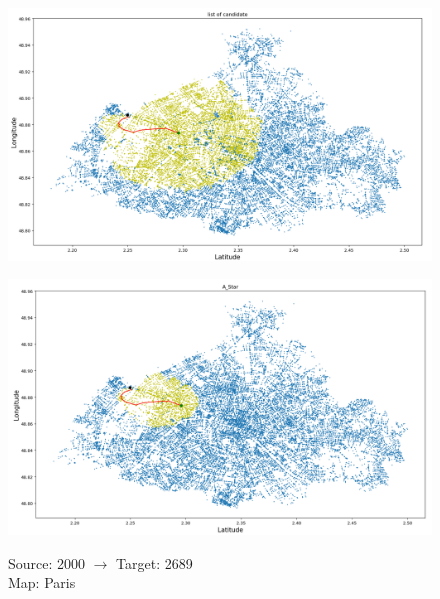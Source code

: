 \documentclass[a4paper,11pt]{report}
\begin{document}
\begin{figure}[H]
	\centering
	\begin{minipage}[b]{\textwidth}
		\includegraphics[width=\textwidth]{img/mapOutput/2000->2689LoC.png}
		\label{fig:ListOfCandidate2}
	\end{minipage}
	\hfill
	\begin{minipage}[b]{\textwidth}
		\includegraphics[width=\textwidth]{img/mapOutput/2000->2689A_Star.png}
		\label{fig:A_Start2}
	\end{minipage}
	Source: 2000 $\to$ Target: 2689\\Map: Paris
\end{figure}
\end{document}
